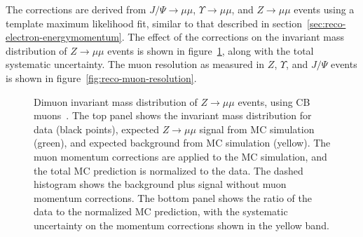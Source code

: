 The corrections are derived from $J/\Psi\rightarrow\mu\mu$, $\Upsilon\rightarrow\mu\mu$, and $Z\rightarrow\mu\mu$ events using a template maximum likelihood fit, similar to that described in section~\ref{sec:reco-electron-energymomentum}. The effect of the corrections on the invariant mass distribution of $Z\rightarrow\mu\mu$ events is shown in figure~\ref{fig:reco-muon-momentum-corrections}, along with the total systematic uncertainty. The muon resolution as measured in $Z$, $\Upsilon$, and $J/\Psi$ events is shown in figure~\ref{fig:reco-muon-resolution}.

\begin{figure}[htbp]
	\centering
	\caption{Dimuon invariant mass distribution of $Z\rightarrow\mu\mu$ events, using CB muons~\cite{TheATLASCollaboration:2014bm}. The top panel shows the invariant mass distribution for data (black points), expected $Z\rightarrow\mu\mu$ signal from MC simulation (green), and expected background from MC simulation (yellow). The muon momentum corrections are applied to the MC simulation, and the total MC prediction is normalized to the data. The dashed histogram shows the background plus signal without muon momentum corrections. The bottom panel shows the ratio of the data to the normalized MC prediction, with the systematic uncertainty on the momentum corrections shown in the yellow band.}
	\label{fig:reco-muon-momentum-corrections}
\end{figure}

